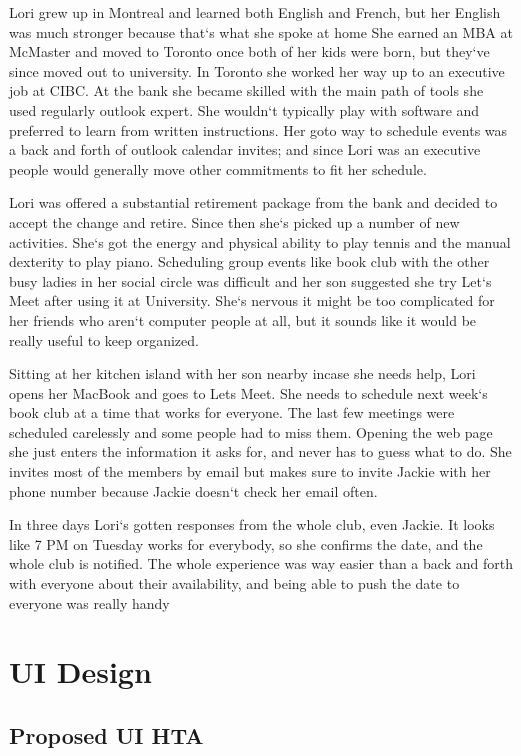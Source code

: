 \documentclass{sigchi}
\begin{document}
Lori grew up in Montreal and learned both English and French, but her English was much stronger because that`s what she spoke at home
She earned an MBA at McMaster and moved to Toronto once both of her kids were born, but they`ve since moved out to university. 
In Toronto she worked her way up to an executive job at CIBC.
At the bank she became skilled with the main path of tools she used regularly outlook expert.
She wouldn`t typically play with software and preferred to learn from written instructions.
Her goto way to schedule events was a back and forth of outlook calendar invites; 
and since Lori was an executive people would generally move other commitments to fit her schedule.
 
Lori was offered a substantial retirement package from the bank and decided to accept the change and retire. 
Since then she`s picked up a number of new activities.
She`s got the energy and physical ability to play tennis and the manual dexterity to play piano.
Scheduling group events like book club with the other busy ladies in her social circle was difficult and her son suggested she try Let`s Meet after using it at University.
She`s nervous it might be too complicated for her friends who aren`t computer people at all, but it sounds like it would be really useful to keep organized.

Sitting at her kitchen island with her son nearby incase she needs help, Lori opens her MacBook and goes to Lets Meet.
She needs to schedule next week`s book club at a time that works for everyone.
The last few meetings were scheduled carelessly and some people had to miss them.
Opening the web page she just enters the information it asks for, and never has to guess what to do.
She invites most of the members by email but makes sure to invite Jackie with her phone number because Jackie doesn`t check her email often.

In three days Lori`s gotten responses from the whole club, even Jackie.
It looks like 7 PM  on Tuesday works for everybody, so she confirms the date, and the whole club is notified.
The whole experience was way easier than a back and forth with everyone about their availability, and being able to push the date to everyone was really handy

\section{UI Design}
\subsection{Proposed UI HTA}
\end{document}
